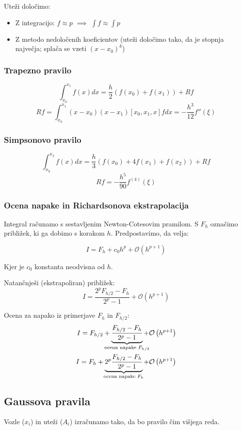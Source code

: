 \begin{multicols}{5}
Uteži določimo:
\begin{itemize}
    \item Z integracijo: $f \approx p$ $\implies$ $\int f \approx \int p$
    \item Z metodo nedoločenih koeficientov (uteži določimo tako, da je stopnja največja; splača se vzeti $(x-x_0)^k$)
\end{itemize}

\subsubsection*{Trapezno pravilo}
\[ \int_{x_0}^{x_1} f(x) dx = \frac{h}{2} (f(x_0) + f(x_1)) + Rf\]
\[ Rf = \int_{x_0}^{x_1} (x-x_0)(x-x_1) [x_0, x_1, x] f dx = -\frac{h^3}{12} f''(\xi)\]

\subsubsection*{Simpsonovo pravilo}
\[ \int_{x_0}^{x_2} f(x) dx = \frac{h}{3} (f(x_0) + 4f(x_1) + f(x_2)) + Rf\]
\[ Rf = -\frac{h^5}{90} f^{(4)}(\xi)\]

\subsubsection*{Ocena napake in Richardsonova ekstrapolacija}
Integral računamo s sestavljenim Newton-Cotesovim pramilom. S $F_h$ označimo približek, ki ga dobimo s 
korakom $h$. Predpostavimo, da velja:

\[ I = F_h + c_0 h^p + \mathcal{O}\left( h^{p+1} \right)\]

Kjer je $c_0$ konstanta neodvisna od $h$.

Natančnješi (ekstrapoliran) približek:
\[ I = \frac{2^p F_{h/2} - F_h}{2^p - 1} + \mathcal{O}\left(h^{p+1}\right)\]

Ocena za napako iz primerjave $F_h$ in $F_{h/2}$:
\begin{align*}
    I = F_{h/2} + \underbrace{\frac{F_{h/2} - F_h}{2^p - 1}}_{\mathclap{\text{ocena napake $F_{h/2}$}}} + \mathcal{O}\left( h^{p+1} \right) \\
    I = F_{h} + \underbrace{2^p\frac{F_{h/2} - F_h}{2^p - 1}}_{\mathclap{\text{ocena napake $F_{h}$}}} + \mathcal{O}\left( h^{p+1} \right) \\
\end{align*}
\subsection*{Gaussova pravila}
Vozle ($x_i$) in uteži ($A_i$) izračunamo tako, da bo pravilo čim višjega reda.


\end{multicols}
